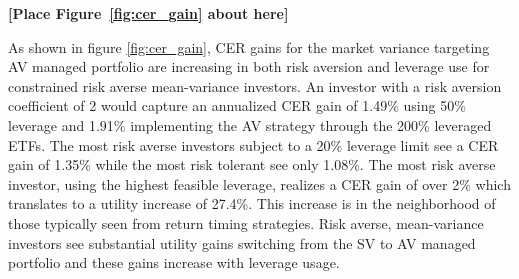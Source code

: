 \bigskip
\centerline{\bf [Place Figure~\ref{fig:cer_gain} about here]}
\bigskip

As shown in figure \ref{fig:cer_gain}, CER gains for the market variance targeting AV managed portfolio are increasing in both risk aversion and leverage use for constrained risk averse mean-variance investors. An investor with a risk aversion coefficient of 2 would capture an annualized CER gain of 1.49\% using 50\% leverage and 1.91\% implementing the AV strategy through the 200\% leveraged ETFs. The most risk averse investors subject to a 20\% leverage limit see a CER gain of 1.35\% while the most risk tolerant see only 1.08\%. The most risk averse investor, using the highest feasible leverage, realizes a CER gain of over 2\% which translates to a utility increase of 27.4\%. This increase is in the neighborhood of those typically seen from return timing strategies. \citep{campbell1997econometrics,moreira_volatility-managed_2017} Risk averse, mean-variance investors see substantial utility gains switching from the SV to AV managed portfolio and these gains increase with leverage usage.

